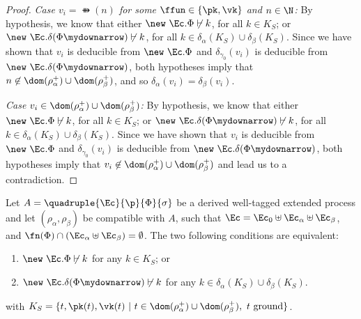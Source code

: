 \begin{proof}
\smallskip{}

\emph{Case $v_i = \ffun(n)$ for some $\ffun \in \{\pk, \vk\}$ and $n \in \N$:} {By
hypothesis, we know that either $\new\ \Ec. \Phi \not\vdash k$,
for all $k \in K_S$; or $\new\ \Ec. \delta(\Phi\mydownarrow) \not\vdash k$, for
all $k \in \delta_\alpha(K_S) \cup \delta_\beta(K_S)$.
Since we have shown that $v_i$ is deducible from $\new\ \Ec. \Phi$
and $\delta_{\gamma_0}(v_i)$ is deducible from $\new\ \Ec. \delta(\Phi\mydownarrow)$, both
hypotheses imply that $n \not\in \dom(\rho^+_\alpha) \cup
\dom(\rho^+_\beta)$, and so $\delta_\alpha(v_i) =
\delta_\beta(v_i)$.}

\smallskip{}

\emph{Case $v_i \in \dom(\rho^+_\alpha) \cup \dom(\rho^+_\beta)$:} 
{By hypothesis, we know that either $\new\ \Ec. \Phi \not\vdash k$,
for all $k \in K_S$; or $\new\ \Ec. \delta(\Phi\mydownarrow) \not\vdash k$, for
all $k \in \delta_\alpha(K_S) \cup \delta_\beta(K_S)$.
Since we have shown that $v_i$ is deducible from $\new\ \Ec. \Phi$
and $\delta_{\gamma_0}(v_i)$ is deducible from $\new\ \Ec. \delta(\Phi\mydownarrow)$, both
hypotheses imply that $v_i \not\in \dom(\rho^+_\alpha) \cup
\dom(\rho^+_\beta)$ and lead us to a contradiction.}
\end{proof}



\begin{corollary}
\label{cor:deltaandkeyhidden}
Let $A = \quadruple{\Ec}{\p}{\Phi}{\sigma}$ be a derived well-tagged extended
process and let $(\rho_\alpha, \rho_\beta)$ be compatible with $A$, such that $\Ec = \Ec_0 \uplus \Ec_\alpha \uplus \Ec_\beta$, and
$\fn(\Phi) \cap (\Ec_\alpha \uplus \Ec_\beta) = \emptyset$.  The two following
conditions are equivalent:
\begin{enumerate}
\item  $\new\ \Ec. \Phi \not\vdash k$ for any $k \in K_S$; or
\item  $\new\ \Ec. \delta(\Phi\mydownarrow) \not\vdash k$ for any {$k \in \delta_\alpha(K_S) \cup \delta_\beta(K_S)$.} 
\end{enumerate}
with 
$K_S = \{t, \pk(t),\vk(t) ~|~ t \in \dom(\rho^+_\alpha) \cup
\dom(\rho^+_\beta),  \mbox{ $t$ ground}\}$. 
\end{corollary}

\smallskip{}

